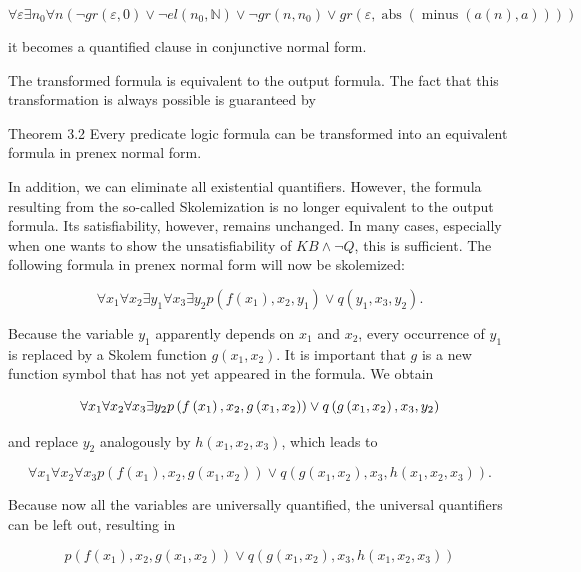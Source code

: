 \documentclass[10pt]{book}
\begin{document}
$$
\forall \varepsilon \exists n_{0} \forall n\left(\neg g r(\varepsilon, 0) \vee \neg e l\left(n_{0}, \mathbb{N}\right) \vee \neg g r\left(n, n_{0}\right) \vee g r(\varepsilon, \operatorname{abs}(\operatorname{minus}(a(n), a)))\right)
$$

it becomes a quantified clause in conjunctive normal form.

The transformed formula is equivalent to the output formula. The fact that this transformation is always possible is guaranteed by

Theorem 3.2 Every predicate logic formula can be transformed into an equivalent formula in prenex normal form.

In addition, we can eliminate all existential quantifiers. However, the formula resulting from the so-called Skolemization is no longer equivalent to the output formula. Its satisfiability, however, remains unchanged. In many cases, especially when one wants to show the unsatisfiability of $K B \wedge \neg Q$, this is sufficient. The following formula in prenex normal form will now be skolemized:

$$
\forall x_{1} \forall x_{2} \exists y_{1} \forall x_{3} \exists y_{2} p\left(f\left(x_{1}\right), x_{2}, y_{1}\right) \vee q\left(y_{1}, x_{3}, y_{2}\right) .
$$

Because the variable $y_{1}$ apparently depends on $x_{1}$ and $x_{2}$, every occurrence of $y_{1}$ is replaced by a Skolem function $g\left(x_{1}, x_{2}\right)$. It is important that $g$ is a new function symbol that has not yet appeared in the formula. We obtain

$$
\forall x_{1} \forall x_{2} \forall x_{3} \exists y_{2} p\left(f\left(x_{1}\right), x_{2}, g\left(x_{1}, x_{2}\right)\right) \vee q\left(g\left(x_{1}, x_{2}\right), x_{3}, y_{2}\right)\index{Contraction hierarchies}
$$

and replace $y_{2}$ analogously by $h\left(x_{1}, x_{2}, x_{3}\right)$, which leads to

$$
\forall x_{1} \forall x_{2} \forall x_{3} p\left(f\left(x_{1}\right), x_{2}, g\left(x_{1}, x_{2}\right)\right) \vee q\left(g\left(x_{1}, x_{2}\right), x_{3}, h\left(x_{1}, x_{2}, x_{3}\right)\right) .
$$

Because now all the variables are universally quantified, the universal quantifiers can be left out, resulting in

$$
p\left(f\left(x_{1}\right), x_{2}, g\left(x_{1}, x_{2}\right)\right) \vee q\left(g\left(x_{1}, x_{2}\right), x_{3}, h\left(x_{1}, x_{2}, x_{3}\right)\right)
$$
\end{document}
